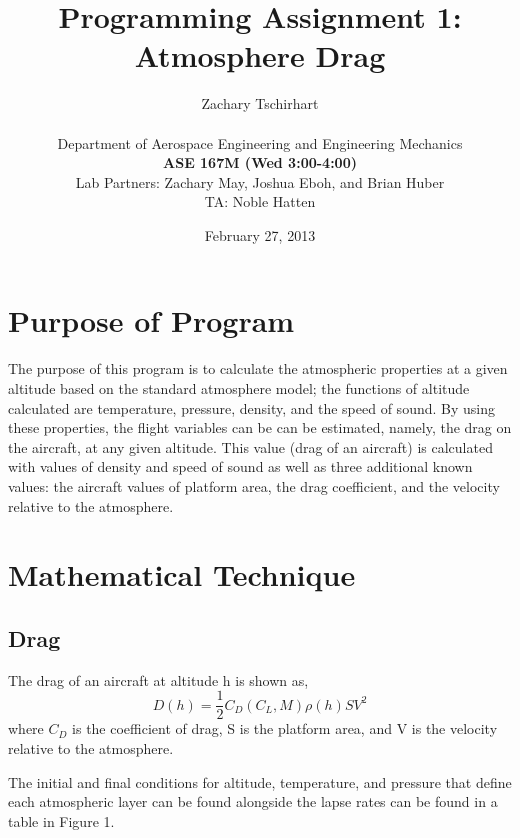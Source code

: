 \documentclass[12pt]{report}
\title{Programming Assignment 1: Atmosphere Drag}
\author{Zachary Tschirhart \\
	\small \\
	\small Department of Aerospace Engineering and Engineering Mechanics \\
	\small \textbf{ASE 167M (Wed 3:00-4:00)} \\
	\small Lab Partners: Zachary May, Joshua Eboh, and Brian Huber \\
	\small
	\small TA: Noble Hatten}
\date{February 27, 2013}
\begin{document}
\maketitle


\tableofcontents
\pagebreak

\setcounter{secnumdepth}{0}





\section{Purpose of Program}
\doublespacing
The purpose of this program is to calculate the atmospheric properties at a given altitude based on the standard atmosphere model; the functions of altitude calculated are temperature, pressure, density, and the speed of sound. By using these properties, the flight variables can be can be estimated, namely, the drag on the aircraft, at any given altitude. This value (drag of an aircraft) is calculated with values of density and speed of sound as well as three additional known values: the aircraft values of platform area, the drag coefficient, and the velocity relative to the atmosphere.






\section{Mathematical Technique}
\doublespacing
\subsection{Drag}
The drag of an aircraft at altitude h is shown as,
\begin{equation}
	D(h) = \frac{1}{2}C_{D}(C_{L},M)\rho(h)SV^2
	\label{equation:drag}
\end{equation}
where \(C_{D}\) is the coefficient of drag, S is the platform area, and V is the velocity relative to the atmosphere.

The initial and final conditions for altitude, temperature, and pressure that define each atmospheric layer can be found alongside the lapse rates can be found in a table in Figure 1.
\end{document}
